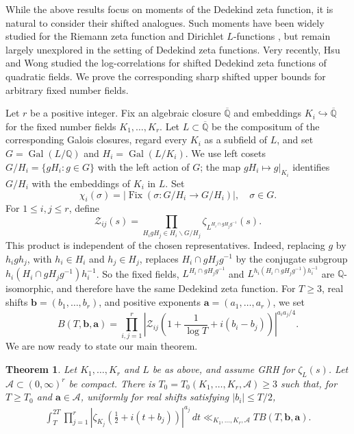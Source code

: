 \documentclass[twoside,reqno,11pt,a4paper]{amsart}
\numberwithin{equation}{section}
\theoremstyle{plain}
\newtheorem{thm}{Theorem}[section]
\theoremstyle{definition}
\theoremstyle{remark}
\DeclareMathOperator{\Gal}{Gal}
\DeclareMathOperator{\Fix}{Fix}
\newcommand{\calZ}{\mathcal Z}
\renewcommand{\le}{\leqslant}
\renewcommand{\ge}{\geqslant}
\begin{document}
While the above results focus on moments of the Dedekind zeta function, it is natural to consider their shifted analogues.  Such moments have been widely studied for the Riemann zeta function \cite{Chandee_shifted,Curran-Correlation} and Dirichlet $L$-functions \cite{Munch,szabo}, but remain largely unexplored in the setting of Dedekind zeta functions. Very recently, Hsu and Wong \cite{Hsu-Wong} studied the log-correlations for shifted Dedekind zeta functions of quadratic fields. We prove the corresponding sharp shifted upper bounds for arbitrary fixed number fields.

	Let $r$ be a positive integer. Fix an algebraic closure $\overline{\mathbb Q}$ and embeddings $K_i\hookrightarrow\overline{\mathbb Q}$ for the fixed number fields $K_1,\ldots,K_r$.  Let $L\subset\overline{\mathbb Q}$ be the compositum of the corresponding Galois closures, regard every $K_i$ as a subfield of $L$, and set $G=\Gal(L/\mathbb Q)$ and $H_i=\Gal(L/K_i)$.  We use left cosets $G/H_i=\{gH_i:g\in G\}$ with the left action of $G$; the map $gH_i\mapsto g|_{K_i}$ identifies $G/H_i$ with the embeddings of $K_i$ in $L$.  Set
\begin{equation*}
\chi_i(\sigma)=|\Fix(\sigma:G/H_i\to G/H_i)|,\quad\sigma\in G.
\end{equation*}
For $1\le  i,j\le  r$, define
\begin{equation*}
        \calZ_{ij}(s)=
        \prod_{H_i gH_j\in H_i\backslash G/H_j}
        \zeta_{L^{H_i\cap gH_jg^{-1}}}(s).
\end{equation*}
This product is independent of the chosen representatives.  Indeed, replacing $g$ by $h_i g h_j$, with $h_i\in H_i$ and $h_j\in H_j$, replaces $H_i\cap gH_jg^{-1}$ by the conjugate subgroup $h_i(H_i\cap gH_jg^{-1})h_i^{-1}$.  So the fixed fields, $L^{H_i\cap gH_jg^{-1}}$ and $L^{h_i(H_i\cap gH_jg^{-1})h_i^{-1}}$ are $\mathbb Q$-isomorphic, and therefore have the same Dedekind zeta function.
For $T\ge3$, real shifts $\mathbf b=(b_1,\ldots,b_{r})$, and positive exponents $\mathbf a=(a_1,\ldots,a_{r})$, we set
\begin{equation*}
        B(T,\mathbf b,\mathbf a)=
        \prod_{i,j=1}^{r}
        \left|
        \calZ_{ij}\left(1+\frac1{\log T}+i(b_i-b_j)\right)
        \right|^{a_i a_j/4}.
\end{equation*}
We are now ready to state our main theorem.
	\begin{thm}\label{main-theorem}
Let $K_1,\ldots,K_r$ and $L$ be as above, and assume GRH for $\zeta_L(s)$. Let $\mathcal A\subset(0,\infty)^r$ be compact. There is $T_0=T_0(K_1,\ldots,K_r,\mathcal A)\ge3$ such that, for $T\ge T_0$ and $\mathbf a\in\mathcal A$, uniformly for real shifts satisfying $|b_i|\le T/2$,
		\begin{align*}
			\int_{T}^{2T} \prod_{j=1}^{r}\left| \zeta_{K_j}\left(\tfrac{1}{2}+i(t+b_j)\right)\right|^{a_j}\,dt
            \ll_{K_1,\ldots,K_{r},\mathcal A}
            T B(T,\mathbf b,\mathbf a).
		\end{align*}
		\end{thm}
\end{document}
